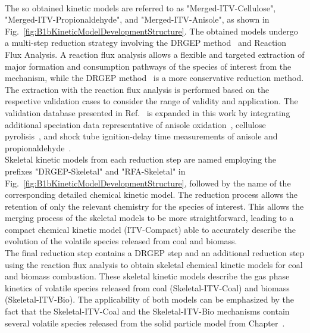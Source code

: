 \begin{refsection}
\\
The so obtained kinetic models are referred to as "Merged-ITV-Cellulose", "Merged-ITV-Propionaldehyde", and "Merged-ITV-Anisole", as shown in Fig.~\ref{fig:B1bKineticModelDevelopmentStructure}. The obtained models undergo a multi-step reduction strategy involving the DRGEP method~\cite{PepiotDesjardins2008a} and Reaction Flux Analysis. A reaction flux analysis allows a flexible and targeted extraction of major formation and consumption pathways of the species of interest from the mechanism, while the DRGEP method~\cite{PepiotDesjardins2008a} is a more conservative reduction method. The extraction with the reaction flux analysis is performed based on the respective validation cases to consider the range of validity and application. The validation database presented in Ref.~\cite{Langer2023} is expanded in this work by integrating additional speciation data representative of anisole oxidation~\cite{Chen2022}, cellulose pyrolisis~\cite{Norinaga2013}, and shock tube ignition-delay time measurements of anisole and propionaldehyde~\cite{Pelucchi2015, AkihKumgeh2011}.
\\
Skeletal kinetic models from each reduction step are named employing the prefixes "DRGEP-Skeletal" and "RFA-Skeletal" in Fig.~\ref{fig:B1bKineticModelDevelopmentStructure}, followed by the name of the corresponding detailed chemical kinetic model. The reduction process allows the retention of only the relevant chemistry for the species of interest. This allows the merging process of the skeletal models to be more straightforward, leading to a compact chemical kinetic model (ITV-Compact) able to accurately describe the evolution of the volatile species released from coal and biomass.
\\
The final reduction step contains a DRGEP step and an additional reduction step using the reaction flux analysis to obtain skeletal chemical kinetic models for coal and biomass combustion. These skeletal kinetic models describe the gas phase kinetics of volatile species released from coal (Skeletal-ITV-Coal) and biomass (Skeletal-ITV-Bio). The applicability of both models can be emphasized by the fact that the Skeletal-ITV-Coal and the Skeletal-ITV-Bio mechanisms contain several volatile species released from the solid particle model from Chapter~.



\end{refsection}
